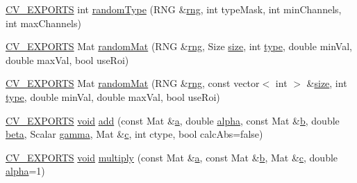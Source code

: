 \begin{DoxyCompactItemize}
\item 
\hyperlink{core_2types__c_8h_a1bf9f0e121b54272da02379cfccd0a2b}{C\-V\-\_\-\-E\-X\-P\-O\-R\-T\-S} int \hyperlink{namespacecvtest_a8ccb9ed0c011023ef7e4b43cea5ed124}{random\-Type} (R\-N\-G \&\hyperlink{core__c_8h_a8d3f239dca9d5c72c8a66d7a1c142efd}{rng}, int type\-Mask, int min\-Channels, int max\-Channels)
\item 
\hyperlink{core_2types__c_8h_a1bf9f0e121b54272da02379cfccd0a2b}{C\-V\-\_\-\-E\-X\-P\-O\-R\-T\-S} Mat \hyperlink{namespacecvtest_aa4b4d920a2fb2eb67490e58953e8f0f3}{random\-Mat} (R\-N\-G \&\hyperlink{core__c_8h_a8d3f239dca9d5c72c8a66d7a1c142efd}{rng}, Size \hyperlink{legacy_8hpp_ae97003f8d5c64cdfb99f6f2606d121b6}{size}, int \hyperlink{imgproc__c_8h_a84612d8738bf935200cf32a103d8efe1}{type}, double min\-Val, double max\-Val, bool use\-Roi)
\item 
\hyperlink{core_2types__c_8h_a1bf9f0e121b54272da02379cfccd0a2b}{C\-V\-\_\-\-E\-X\-P\-O\-R\-T\-S} Mat \hyperlink{namespacecvtest_a0aa43772f6987882cc98332627f4c21a}{random\-Mat} (R\-N\-G \&\hyperlink{core__c_8h_a8d3f239dca9d5c72c8a66d7a1c142efd}{rng}, const vector$<$ int $>$ \&\hyperlink{legacy_8hpp_ae97003f8d5c64cdfb99f6f2606d121b6}{size}, int \hyperlink{imgproc__c_8h_a84612d8738bf935200cf32a103d8efe1}{type}, double min\-Val, double max\-Val, bool use\-Roi)
\item 
\hyperlink{core_2types__c_8h_a1bf9f0e121b54272da02379cfccd0a2b}{C\-V\-\_\-\-E\-X\-P\-O\-R\-T\-S} \hyperlink{legacy_8hpp_a8bb47f092d473522721002c86c13b94e}{void} \hyperlink{namespacecvtest_a9ec05f98099c0ae2c5ac12e842e12e86}{add} (const Mat \&\hyperlink{legacy_8hpp_a1031d0e0a97a340abfe0a6ab9e831045}{a}, double \hyperlink{legacy_8hpp_a95fc8341ca418bc06b36160632af6d47}{alpha}, const Mat \&\hyperlink{legacy_8hpp_ac04272e8ca865b8fba18d36edae9fd2a}{b}, double \hyperlink{legacy_8hpp_af8b31eb489dfbd87f3b1a1925cca3589}{beta}, Scalar \hyperlink{legacy_8hpp_a977df9847c7e455667f9fdaa49fbaa11}{gamma}, Mat \&\hyperlink{legacy_8hpp_a1971420173e06f45845eed2ab4e3d5d0}{c}, int ctype, bool calc\-Abs=false)
\item 
\hyperlink{core_2types__c_8h_a1bf9f0e121b54272da02379cfccd0a2b}{C\-V\-\_\-\-E\-X\-P\-O\-R\-T\-S} \hyperlink{legacy_8hpp_a8bb47f092d473522721002c86c13b94e}{void} \hyperlink{namespacecvtest_a5ccf7637727de44a3f68f53b3abf4b07}{multiply} (const Mat \&\hyperlink{legacy_8hpp_a1031d0e0a97a340abfe0a6ab9e831045}{a}, const Mat \&\hyperlink{legacy_8hpp_ac04272e8ca865b8fba18d36edae9fd2a}{b}, Mat \&\hyperlink{legacy_8hpp_a1971420173e06f45845eed2ab4e3d5d0}{c}, double \hyperlink{legacy_8hpp_a95fc8341ca418bc06b36160632af6d47}{alpha}=1)

\end{DoxyCompactItemize}
